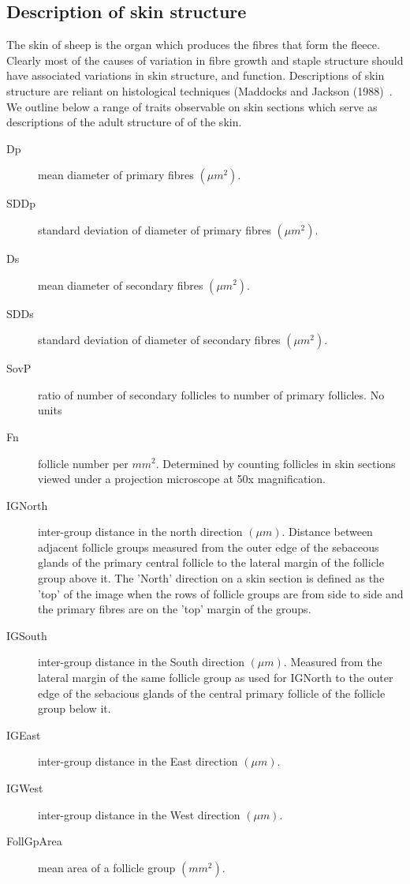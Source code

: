 \documentclass[titlepage]{article}  %
\begin{document}
\subsection{Description of skin structure}
\label{sec:skinstruct}
The skin of sheep is the organ which produces the fibres that form the fleece. Clearly most of the causes of variation in fibre growth and staple structure should have associated variations in skin structure, and function. Descriptions of skin structure are reliant on histological techniques (Maddocks and Jackson (1988)~\cite{madd:88}. We outline below a range of traits observable on skin sections which serve as descriptions of the adult structure of of the skin.

\begin{description}
\item[Dp]  mean diameter of primary fibres $(\mu m^2)$.
\item[SDDp] standard deviation of diameter of primary fibres $(\mu m^2)$.
\item[Ds] mean diameter of secondary fibres $(\mu m^2)$.
\item[SDDs] standard deviation of diameter of secondary fibres $(\mu m^2)$.
\item[SovP] ratio of number of secondary follicles to number of primary follicles. No units
\item[Fn] follicle number per $mm^2$. Determined by counting follicles in skin sections viewed under a projection microscope at 50x magnification.
\item[IGNorth]  inter-group distance in the north direction $(\mu m)$. Distance between adjacent follicle groups measured from the outer edge of the sebaceous glands of the primary central follicle to the lateral margin of the follicle group above it. The 'North' direction on a skin section is defined as the 'top' of the image when the rows of follicle groups are from side to side and the primary fibres are on the 'top' margin of the groups.
\item[IGSouth] inter-group distance in the South direction $(\mu m)$. Measured from the lateral margin of the same follicle group as used for IGNorth to the outer edge of the sebacious glands of the central primary follicle of the follicle group below it.
\item[IGEast] inter-group distance in the East direction $(\mu m)$.
\item[IGWest] inter-group distance in the West direction $(\mu m)$.
\item[FollGpArea] mean area of a follicle group $(mm^2)$.

\end{description}
\end{document}
